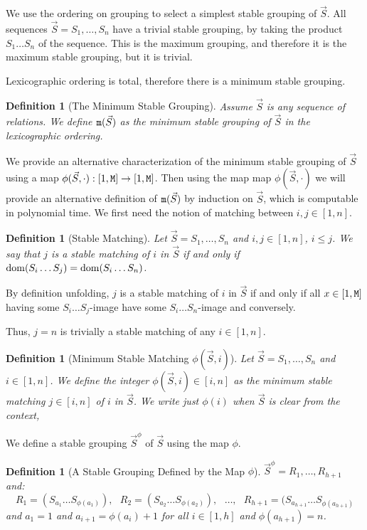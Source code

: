 \documentclass{lmcs}
\newtheorem{definition}[theorem]{Definition}
\begin{document}
We use the ordering on grouping to select a simplest stable grouping of $\vec{S}$.
All sequences $\vec{S}=S_1, \ldots, S_n$ have a trivial stable grouping, by taking the
product $S_1 \ldots S_n$ of the sequence. This is the maximum grouping, 
and therefore it is the maximum stable grouping, but it is trivial.

Lexicographic ordering is total, therefore there is a minimum stable grouping.

\begin{definition}[The Minimum Stable Grouping]
\label{definition-minstable}
Assume $\vec{S}$ is any sequence of relations. We define 
${\tt m}(\vec{S})$ as the minimum stable grouping of $\vec{S}$ in the
lexicographic ordering.
\end{definition}


We provide an alternative characterization of the minimum stable grouping of $\vec{S}$
using a map $\phi(\vec{S},\cdot) : [1,{\tt M}] \rightarrow  [1,{\tt M}]$. 
Then using the map  map $\phi(\vec{S},\cdot)$ we will provide an alternative definition of 
${\tt m}(\vec{S})$ by induction on $\vec{S}$, which is computable in polynomial time. 
We first need the notion of matching between $i,j \in [1,n]$.

\begin{definition}[Stable Matching]
Let $\vec{S} = S_1, \ldots, S_n$ and $i,j \in [1,n]$, $i \le j$.
We say that $j$ is a stable matching of $i$ in $\vec{S}$
if and only if ${\rm dom}(S_i \ldots S_j) = {\rm dom}(S_i \ldots S_n)$.
\end{definition}

By definition unfolding, $j$ is a stable matching of $i$ in $\vec{S}$
if and only if all $x \in [1,{\tt M}]$ having some $S_i \ldots S_j$-image have some
$S_i \ldots S_n$-image and conversely. 

Thus, $j=n$ is trivially a stable matching of any $i \in [1,n]$.

\begin{definition}[Minimum Stable Matching $\phi(\vec{S},i)$]
Let $\vec{S} = S_1, \ldots, S_n$ and $i \in [1,n]$.
We define the integer $\phi(\vec{S},i) \in [i,n]$ as the minimum stable matching $j\in [i,n]$ 
of $i$ in $\vec{S}$. We write just $\phi(i)$ when $\vec{S}$ is clear from the context,
\end{definition}

We define a stable grouping $\vec{S}^{\phi}$ of $\vec{S}$ using the map $\phi$.

\begin{definition} [A Stable Grouping Defined by the Map $\phi$]
$\vec{S}^{\phi}=R_1, \ldots, R_{h+1}$ and: 
$$
R_1 = (S_{a_1}\ldots S_{\phi(a_1)}), \ \ \ 
R_2 = (S_{a_2}\ldots S_{\phi(a_2)}), \ \ \ 
\ldots, \ \ \ 
R_{h+1} = (S_{a_{h+1}}\ldots S_{\phi(a_{h+1})}
$$ 
and $a_1=1$ and $a_{i+1} = \phi(a_i)+1$ 
for all $i \in [1,h]$ and $\phi(a_{h+1}) = n$. 
\end{definition}
\end{document}
